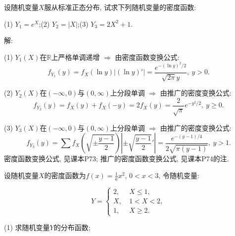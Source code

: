 \documentclass[standard]{ExBook}
\begin{document}
\begin{qitems}
\vspace{-5em}

    \begin{bbox}
    \begin{shaded}
        \qitem
设随机变量$X$服从标准正态分布, 试求下列随机变量的密度函数:

(1) $Y_{1}=e^X$;\qquad(2) $Y_{2}=|X|$;\qquad(3) $Y_{3}=2X^2+1$.
    \end{shaded}
    \end{bbox}

\vspace{-5em}

    \begin{bbox}
解: 

(1) $Y_1(X)$在$\mathbb{R}$上严格单调递增 $\Longrightarrow$ 由密度函数变换公式:
$$f_{Y_1}(y)=f_{X}(\ln y)|(\ln y)'|=\displaystyle\frac{e^{-(\ln y)^2/2}}{\sqrt{2\pi}y},\ y>0.$$

(2) $Y_2(X)$在$(-\infty,0)$与$(0,\infty)$上分段单调 $\Longrightarrow$ 由推广的密度变换公式:
$$f_{Y_2}(y)=f_{X}(y)+f_{X}(-y)=2f_{X}(y)=\displaystyle\frac{2}{\sqrt{\pi}}e^{-y^2/2},\ y \geq 0.$$

(3) $Y_3(X)$在$(-\infty,0)$与$(0,\infty)$上分段单调 $\Longrightarrow$ 由推广的密度变换公式:
$$f_{Y_3}(y)=\sum f_{X}(\sqrt{\pm\displaystyle\frac{y-1}{2}})\left|\pm\sqrt{\displaystyle\frac{y-1}{2}}'\right|=\displaystyle\frac{e^{-(y-1)/4}}{2\sqrt{\pi(y-1)}},\ y > 1.$$
\textcolor{themeColor}{\selectfont {} 密度函数变换公式, 见课本P73; 推广的密度函数变换公式, 见课本P74的注.}
    \end{bbox}

\vspace{-5em}

    \begin{bbox}
    \begin{shaded}
        \qitem
设随机变量$X$的密度函数为$f(x)=\frac{1}{a}x^2$, $0 < x < 3$, 令随机变量:
\vspace{-2em}
\begin{center}
\begin{equation}
    Y=
    \left\{
    \begin{array}{cl}
        \nonumber
        2,\ &X \leq 1,\\
        X,\ &1 < X < 2,\\
        1,\ &X \geq 2.
    \end{array}
    \right.
\end{equation}
\end{center}
(1) 求随机变量$Y$的分布函数;


\end{shaded}
\end{bbox}
\end{qitems}
\end{document}

